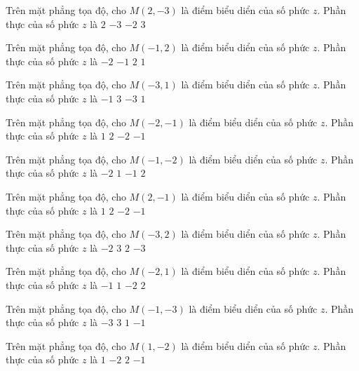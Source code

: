 \begin{ex}
 Trên mặt phẳng tọa độ, cho $M(2,-3)$ là điểm biểu diển của số phức $z$. Phần thực của số phức $z$ là
\choice
{\True $2$}
{$-3$}
{$-2$}
{$3$}
\end{ex}
\begin{ex}
 Trên mặt phẳng tọa độ, cho $M(-1,2)$ là điểm biểu diển của số phức $z$. Phần thực của số phức $z$ là
\choice
{$-2$}
{\True $-1$}
{$2$}
{$1$}
\end{ex}
\begin{ex}
 Trên mặt phẳng tọa độ, cho $M(-3,1)$ là điểm biểu diển của số phức $z$. Phần thực của số phức $z$ là
\choice
{$-1$}
{$3$}
{\True $-3$}
{$1$}
\end{ex}
\begin{ex}
 Trên mặt phẳng tọa độ, cho $M(-2,-1)$ là điểm biểu diển của số phức $z$. Phần thực của số phức $z$ là
\choice
{$1$}
{$2$}
{\True $-2$}
{$-1$}
\end{ex}
\begin{ex}
 Trên mặt phẳng tọa độ, cho $M(-1,-2)$ là điểm biểu diển của số phức $z$. Phần thực của số phức $z$ là
\choice
{$-2$}
{$1$}
{\True $-1$}
{$2$}
\end{ex}
\begin{ex}
 Trên mặt phẳng tọa độ, cho $M(2,-1)$ là điểm biểu diển của số phức $z$. Phần thực của số phức $z$ là
\choice
{$1$}
{\True $2$}
{$-2$}
{$-1$}
\end{ex}
\begin{ex}
 Trên mặt phẳng tọa độ, cho $M(-3,2)$ là điểm biểu diển của số phức $z$. Phần thực của số phức $z$ là
\choice
{$-2$}
{$3$}
{$2$}
{\True $-3$}
\end{ex}
\begin{ex}
 Trên mặt phẳng tọa độ, cho $M(-2,1)$ là điểm biểu diển của số phức $z$. Phần thực của số phức $z$ là
\choice
{$-1$}
{$1$}
{\True $-2$}
{$2$}
\end{ex}
\begin{ex}
 Trên mặt phẳng tọa độ, cho $M(-1,-3)$ là điểm biểu diển của số phức $z$. Phần thực của số phức $z$ là
\choice
{$-3$}
{$3$}
{$1$}
{\True $-1$}
\end{ex}
\begin{ex}
 Trên mặt phẳng tọa độ, cho $M(1,-2)$ là điểm biểu diển của số phức $z$. Phần thực của số phức $z$ là
\choice
{\True $1$}
{$-2$}
{$2$}
{$-1$}
\end{ex}
